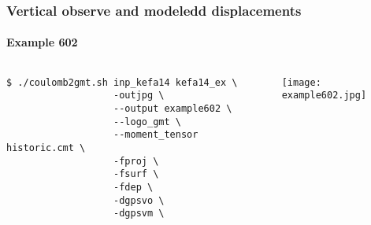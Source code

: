 \begin{frame}[t,fragile]
  \frametitle{Vertical observe and modeledd displacements}
  \framesubtitle{Example 602}
  \label{ch5fr:ex602}
\begin{columns}[t]
  \begin{column}{.5\textwidth}
\begin{scriptsize}
\begin{verbatim}
$ ./coulomb2gmt.sh inp_kefa14 kefa14_ex \
                   -outjpg \ 
                   --output example602 \
                   --logo_gmt \
                   --moment_tensor historic.cmt \
                   -fproj \
                   -fsurf \
                   -fdep \
                   -dgpsvo \
                   -dgpsvm \ 
\end{verbatim}
\end{scriptsize}

  \end{column}
  \begin{column}{.5\textwidth}

\centering
  \texttt{[image: example602.jpg]}
  \end{column}
\end{columns}

\end{frame}
\note{}
